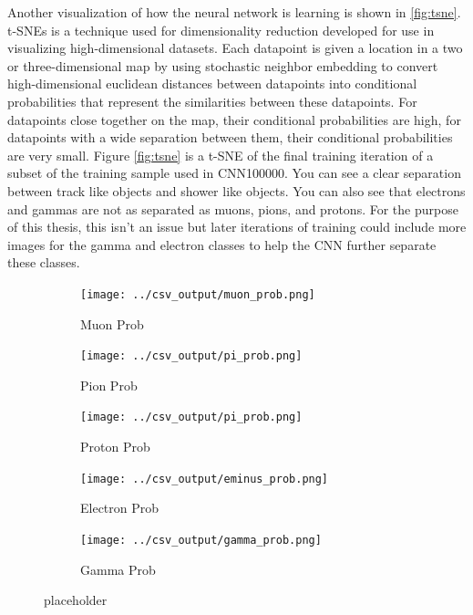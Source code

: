 Another visualization of how the neural network is learning is shown in \ref{fig:tsne}.  t-SNEs \cite{tsne} is a technique used for dimensionality reduction developed for use in visualizing high-dimensional datasets. Each datapoint is given a location in a two or three-dimensional map by using stochastic neighbor embedding to convert high-dimensional euclidean distances between datapoints into conditional probabilities that represent the similarities between these datapoints. For datapoints close together on the map, their conditional probabilities are high, for datapoints with a wide separation between them, their conditional probabilities are very small. Figure \ref{fig:tsne} is a t-SNE of the final training iteration of a subset of the training sample used in CNN100000. You can see a clear separation between track like objects and shower like objects. You can also see that electrons and gammas are not as separated as muons, pions, and protons. For the purpose of this thesis, this isn't an issue but later iterations of training could include more images for the gamma and electron classes to help the CNN further separate these classes.

\begin{figure}
\centering
	\begin{subfigure}[t]{.5\textwidth}
	\centering
	\texttt{[image: ../csv\_output/muon\_prob.png]}
	\label{fig:muonprob}
	\caption{Muon Prob}
	\end{subfigure}
	
	\begin{subfigure}[t]{.5\textwidth}
	\centering
	\texttt{[image: ../csv\_output/pi\_prob.png]}
	\label{fig:piprob}
	\caption{Pion Prob}
	\end{subfigure}
	\quad
	
	\begin{subfigure}[t]{.5\textwidth}
	\centering
	\texttt{[image: ../csv\_output/pi\_prob.png]}
	\label{fig:piprob}
	\caption{Proton Prob}
	\end{subfigure}
	
	\begin{subfigure}[t]{.5\textwidth}
	\centering
	\texttt{[image: ../csv\_output/eminus\_prob.png]}
	\label{fig:eminusprob}
	\caption{Electron Prob}
	\end{subfigure}
	\quad
		
	\begin{subfigure}[t]{.5\textwidth}
	\centering
	\texttt{[image: ../csv\_output/gamma\_prob.png]}
	\label{fig:gammaprob}
	\caption{Gamma Prob}
	\end{subfigure}
\caption{placeholder}
\label{fig:particleprob}
\end{figure}





